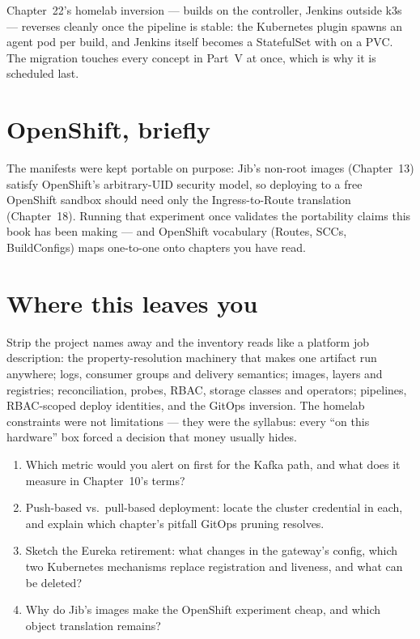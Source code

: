 Chapter~22's homelab inversion --- builds on the controller, Jenkins
outside k3s --- reverses cleanly once the pipeline is stable: the
Kubernetes plugin spawns an agent pod per build, and Jenkins itself
becomes a StatefulSet with  on a PVC. The
migration touches every concept in Part~V at once, which is why it is
scheduled last.

\section{OpenShift, briefly}

The manifests were kept portable on purpose: Jib's non-root images
(Chapter~13) satisfy OpenShift's arbitrary-UID security model, so
deploying to a free OpenShift sandbox should need only the
Ingress-to-Route translation (Chapter~18). Running that experiment
once validates the portability claims this book has been making ---
and OpenShift vocabulary (Routes, SCCs, BuildConfigs) maps one-to-one
onto chapters you have read.

\section{Where this leaves you}

Strip the project names away and the inventory reads like a platform
job description: the property-resolution machinery that makes one
artifact run anywhere; logs, consumer groups and delivery semantics;
images, layers and registries; reconciliation, probes, RBAC, storage
classes and operators; pipelines, RBAC-scoped deploy identities, and
the GitOps inversion. The homelab constraints were not limitations ---
they were the syllabus: every ``on this hardware'' box forced a
decision that money usually hides.

\begin{quiz}
\begin{enumerate}
  \item Which metric would you alert on first for the Kafka path, and
  what does it measure in Chapter~10's terms?
  \item Push-based vs.\ pull-based deployment: locate the cluster
  credential in each, and explain which chapter's pitfall GitOps
  pruning resolves.
  \item Sketch the Eureka retirement: what changes in the gateway's
  config, which two Kubernetes mechanisms replace registration and
  liveness, and what can be deleted?
  \item Why do Jib's images make the OpenShift experiment cheap, and
  which object translation remains?
\end{enumerate}
\end{quiz}
